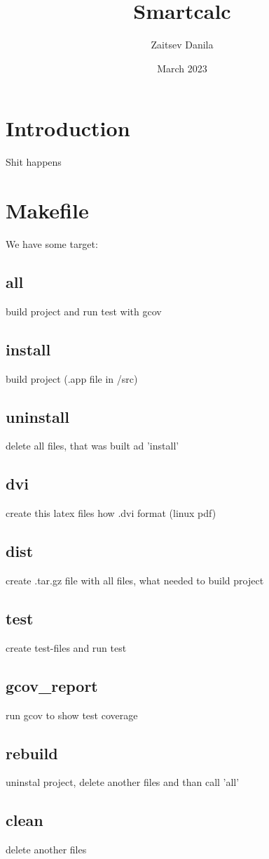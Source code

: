 \documentclass{article}
\title{Smartcalc}
\author{Zaitsev Danila}
\date{March 2023}
\begin{document}
\maketitle

\section{Introduction}
Shit happens
\section{Makefile}
We have some target:
\subsection{all}
build project and run test with gcov
\subsection{install}
build project (.app file in /src)
\subsection{uninstall}
delete all files, that was built ad 'install'
\subsection{dvi}
create this latex files how .dvi format (linux pdf)
\subsection{dist}
create .tar.gz file with all files, what needed to build project
\subsection{test}
create test-files and run test
\subsection{gcov_report}
run gcov to show test coverage
\subsection{rebuild}
uninstal project, delete another files and than call 'all'
\subsection{clean}
delete another files
\end{document}

